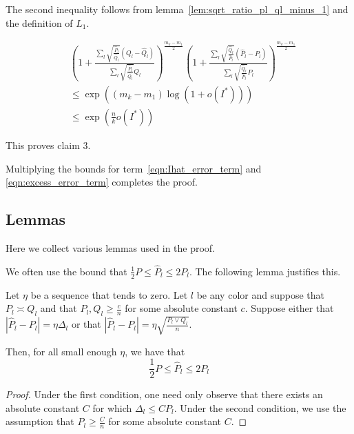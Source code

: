 \documentclass{article}
\begin{document}
The second inequality follows from lemma~\ref{lem:sqrt_ratio_pl_ql_minus_1} and the definition of $L_1$. 

\begin{align*}
& \left( 1 + 
   \frac{\sum_l \sqrt{\frac{\hat{P}_l}{\hat{Q}_l}} (Q_l - \hat{Q}_l)}
        {\sum_l \sqrt{\frac{\hat{P}_l}{\hat{Q}_l}} \hat{Q}_l} 
     \right)^{\frac{m_k - m_1}{2}} 
   \left( 1+ \frac{\sum_l \sqrt{\frac{\hat{Q}_l}{\hat{P}_l}} (\hat{P}_l - P_l)}
         {\sum_l \sqrt{\frac{\hat{Q}_l}{\hat{P}_l}} P_l } \right)^{\frac{m_k - m_1}{2}} 
\\
&\leq \exp\left( (m_k - m_1) \log(1 + o(I^*) ) \right) \\
&\leq \exp \left( \frac{n}{k} o(I^*) \right) 
\end{align*}

This proves claim 3. 

Multiplying the bounds for term~\ref{eqn:Ihat_error_term} and \ref{eqn:excess_error_term} completes the proof. 



\subsection{Lemmas}

Here we collect various lemmas used in the proof.

We often use the bound that $\frac{1}{2} P \leq \hat{P}_l \leq 2 P_l$. The following lemma justifies this.

\begin{lemma}
\label{lem:bound_ratio_P_Pl}
Let $\eta$ be a sequence that tends to zero. Let $l$ be any color and suppose that $P_l \asymp Q_l$ and that $P_l, Q_l \geq \frac{c}{n}$ for some absolute constant $c$. Suppose either that $|\hat{P}_l - P_l| = \eta \Delta_l$ or that $| \hat{P}_l - P_l | = \eta \sqrt{ \frac{P_l \vee Q_l}{n} }$. 

Then, for all small enough $\eta$, we have that
\[
\frac{1}{2} P \leq \hat{P}_l \leq 2 P_l
\]

\end{lemma}

\begin{proof}
Under the first condition, one need only observe that there exists an absolute constant $C$ for which $\Delta_l \leq C P_l$. Under the second condition, we use the assumption that $P_l \geq \frac{C}{n}$ for some absolute constant $C$. 

\end{proof}
\end{document}
